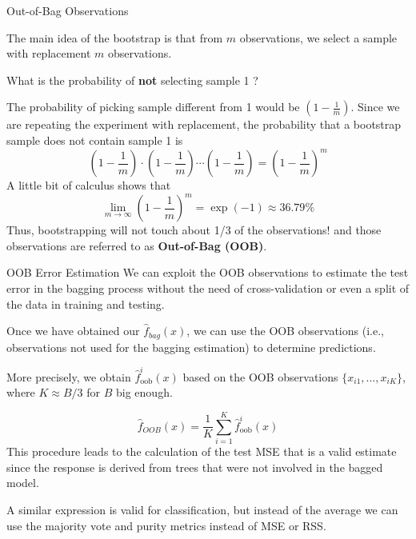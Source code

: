 \documentclass{beamer}
\begin{document}
\begin{frame}{Out-of-Bag Observations}
	
	The main idea of the bootstrap is that from $m$ observations, we select a sample with replacement $m$ observations.
	
	What is the probability of {\bf not} selecting sample 1 ?
	
	The probability of picking sample different from 1 would be 
	$(1 - \frac{1}{m})$. Since we are repeating the experiment with replacement, the probability that a bootstrap sample does not contain sample 1 is 
	\begin{equation*}
		\left(1 - \frac{1}{m}\right) \cdot \left(1 - \frac{1}{m}\right) \cdots \left(1 - \frac{1}{m}\right) = \left(1 - \frac{1}{m}\right)^m
	\end{equation*}
	 A little bit of calculus shows that 
	 \begin{equation*}
	 \lim_{m\to\infty}\left(1-\frac{1}{m}\right)^m= \exp(-1) \approx 36.79\%
	 \end{equation*}
Thus, bootstrapping will not touch about 1/3 of the observations!
and those observations are referred to as {\bf Out-of-Bag (OOB)}.  
\end{frame}

\begin{frame}{OOB Error Estimation}
	We can exploit the OOB observations to estimate the test error in the bagging process without the need of cross-validation or even a split of the data in training and testing.
	
	Once we have obtained our $\hat{f}_{bag}(x)$, we can use the OOB observations (i.e., observations not used for the bagging estimation) to determine predictions. 
	
	More precisely, we obtain $\hat{f}_{\textrm{oob}}^i (x)$ based on the OOB observations $\{x_{i1},\ldots, x_{iK}\}$, where $K \approx B/3$ for $B$ big enough. 
		
		
	
	
	\begin{equation*}
		\hat{f}_{OOB}(x)= \frac{1}{K}\sum_{i=1}^{K} \hat{f}^{i}_{\textrm{oob}}(x)
	\end{equation*}
This procedure leads to the calculation of the test MSE that is a valid estimate since the response is derived from trees that were not involved in the bagged model.

A similar expression is valid for classification, but instead of the average we can use the majority vote and purity metrics instead of MSE or RSS. 
\end{frame}
\end{document}
